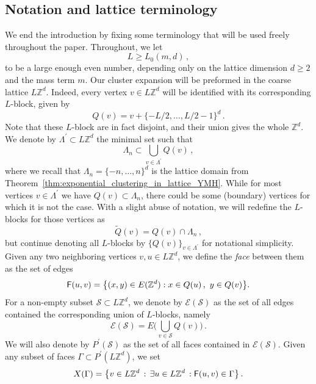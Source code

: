 \documentclass[11pt]{article}
\theoremstyle{definition}
\theoremstyle{remark}
\numberwithin{theorem}{section}
\def\La{{\Lambda}}
\def\Ga{{\Gamma}}
\newcommand{\bZ}{\mathbb Z}
\newcommand{\cE}{\mathcal{E}}
\begin{document}
    \subsection{Notation and lattice terminology}
    We end the introduction by fixing some terminology that will be used freely throughout the paper. Throughout, we let 
    \begin{equation}
            \label{eq:choice_of_L}
            L \ge L_0(m,d) \, ,
        \end{equation}
    to be a large enough even number, depending only on the lattice dimension $d\ge 2$ and the mass term $m$. Our cluster expansion will be preformed in the coarse lattice $L \bZ^d$. Indeed, every vertex $v \in L\bZ^d$ will be identified with its corresponding $L$-block, given by
    \[
    Q(v) = v + \{-L/2,\ldots,L/2-1\}^d \, .
    \]
    Note that these $L$-block are in fact disjoint, and their union gives the whole $\bZ^d$. We denote by $\La^\prime \subset L\bZ^d$ the minimal set such that 
    \begin{equation} \label{eq:def_of_la_prime}
        \La_n \subset \bigcup_{v\in \La^\prime} Q(v) \, , 
    \end{equation}
    where we recall that $\La_n= \{-n,\ldots,n\}^d$ is the lattice domain from Theorem~\ref{thm:exponential_clustering_in_lattice_YMH}. While for most vertices $v\in \La^\prime$ we have $Q(v)\subset \La_n$, there could be some (boundary) vertices for which it is not the case. With a slight abuse of notation, we will redefine the $L$-blocks for those vertices as
    \[
    \widetilde Q(v) = Q(v) \cap \La_n  \, ,
    \]
    but continue denoting all $L$-blocks by $\{Q(v)\}_{v\in \La^\prime}$ for notational simplicity. Given any two neighboring vertices $v,u\in L\bZ^d$, we define the \emph{face} between them as the set of edges
    \[
    {\sf F}(u, v) = \big\{ (x,y) \in E(\mathbb{Z}^d)  :  x\in Q(u) \, ,\   y\in Q(v) \big\}.
    \]
    For a non-empty subset $\mathcal{S}\subset L\bZ^d$, we denote by $\cE(\mathcal{S})$ as the set of all edges contained the corresponding union of $L$-blocks, namely  
    \[
    \cE(\mathcal{S}) = E\Big(\bigcup_{v\in \mathcal{S}} Q(v) \Big) \, .
    \]
    We will also denote by $P^\prime(\mathcal{S})$ as the set of all faces contained in $\cE(\mathcal{S})$. Given any subset of faces $\Ga\subset P^\prime(L\bZ^d)$, we set 
    \begin{equation}\label{xsdef}
        X(\Ga) = \big\{ v\in L\bZ^d \, : \, \exists u\in L\bZ^d \, : {\sf F}(u,v) \in \Ga  \big\} \, .
    \end{equation}
\end{document}
